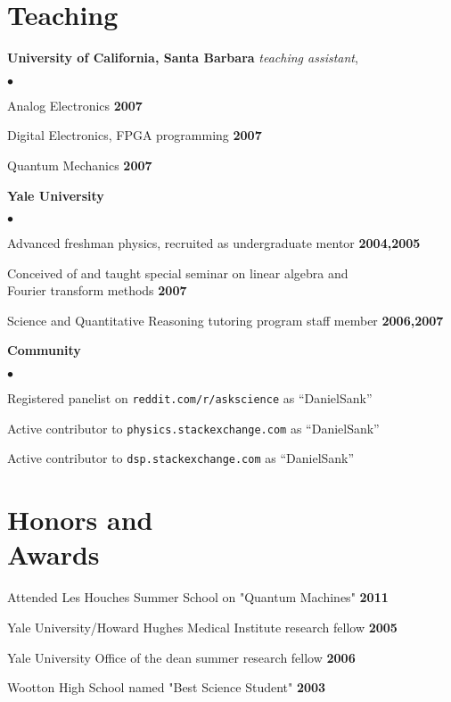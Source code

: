 \documentclass[margin=2cm,line]{res}
\newenvironment{list3}{
  \begin{list}{}{%
      \setlength{\itemsep}{0in}
      \setlength{\parsep}{0in} \setlength{\parskip}{0in}
      \setlength{\topsep}{0in} \setlength{\partopsep}{0in}
      \setlength{\leftmargin}{0.2in}}}{\end{list}}
\newenvironment{list4}{
  \begin{list}{$\bullet$}{%
      \setlength{\itemsep}{0in}
      \setlength{\parsep}{0in} \setlength{\parskip}{0in}
      \setlength{\topsep}{0in} \setlength{\partopsep}{0in}
      \setlength{\leftmargin}{0.2in}}}{\end{list}}
\begin{document}
\begin{resume}
\section{\sc Teaching}
{\bf University of California, Santa Barbara} \textit{teaching assistant},\\
\vspace*{-.15in}
\begin{list4}
\item Analog Electronics \hfill {\bf 2007}
\item Digital Electronics, FPGA programming \hfill {\bf 2007}
\item Quantum Mechanics \hfill {\bf 2007}
\end{list4}
{\bf Yale University}
\begin{list4}
\item Advanced freshman physics, recruited as undergraduate mentor \hfill {\bf 2004,2005}
\item Conceived of and taught special seminar on linear algebra and\\Fourier transform methods \hfill {\bf 2007}
\item Science and Quantitative Reasoning tutoring program staff member \hfill {\bf 2006,2007}
\end{list4}
{\bf Community}
\begin{list4}
\item Registered panelist on \texttt{reddit.com/r/askscience} as ``DanielSank''
\item Active contributor to \texttt{physics.stackexchange.com} as ``DanielSank''
\item Active contributor to \texttt{dsp.stackexchange.com} as ``DanielSank''\\
\end{list4}


\section{\sc Honors and\\ Awards}
\begin{list3}
\item Attended Les Houches Summer School on "Quantum Machines" \hfill {\bf 2011}
\item Yale University/Howard Hughes Medical Institute research fellow \hfill {\bf 2005}
\item Yale University Office of the dean summer research fellow \hfill {\bf 2006}
\item Wootton High School named "Best Science Student" \hfill {\bf 2003}
\end{list3}


\end{resume}
\end{document}
